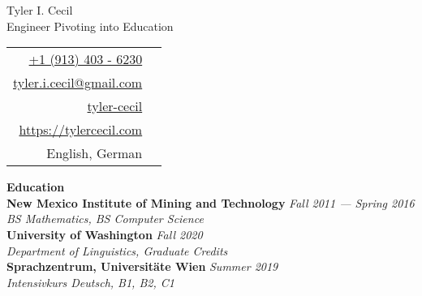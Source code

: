 \documentclass[11pt,a4paper,sans]{article}
\newcommand{\cvcolor}[1]{{\color{MidnightBlue}#1}}
\renewcommand{\section}[1]{
  \cvcolor{\noindent \textbf{\LARGE #1}}
  \vspace{.5em}\\
}
\begin{document}
\noindent
\begin{minipage}{0.675\linewidth}
  \vspace{1.75em}
  {
    \fontsize{40pt}{50pt}\selectfont
    \noindent
    Tyler I. Cecil
  }\\
  {\Large \color{darkgray}
    {
      \noindent
      Engineer Pivoting into Education
    }
  }
\end{minipage}
\hfill
\begin{tabular}{|rl}
  \href{tel:+1 (913) 403 - 6230}{+1 (913) 403 - 6230}&\cvcolor{\faPhone} \\
  \href{mailto:tyler.i.cecil@gmail.com}{tyler.i.cecil@gmail.com}&\cvcolor{\faEnvelope} \\
  \href{https://www.linkedin.com/in/tyler-cecil/}{tyler-cecil}&\cvcolor{\faLinkedinSquare} \\
  \href{https://tylercecil.com}{https://tylercecil.com}&\cvcolor{\faGlobe} \\
  English, German & \cvcolor{\faLanguage} \\
\end{tabular}

\vspace{0.5em}
\noindent\hrulefill
\vspace{1em}

\section{Education}
\textbf{New Mexico Institute of Mining and Technology} \hfill \textsl{Fall 2011 --- Spring 2016}\\
\textsl{BS Mathematics, BS Computer Science}\\
\textbf{University of Washington} \hfill \textsl{Fall 2020}\\
\textsl{Department of Linguistics, Graduate Credits}\\
\textbf{Sprachzentrum, Universitäte Wien} \hfill \textsl{Summer 2019}\\
\textsl{Intensivkurs Deutsch, B1, B2, C1}\\
\end{document}
